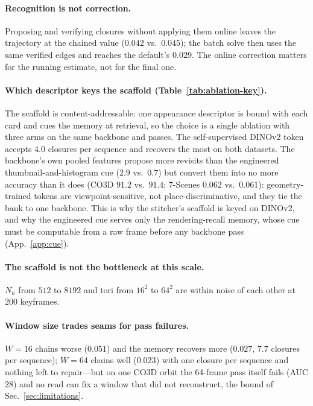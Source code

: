 \paragraph{Recognition is not correction.}
Proposing and verifying closures without applying them online leaves the trajectory at the chained value ($0.042$
vs.\ $0.045$); the batch solve then uses the same verified edges and reaches the default's $0.029$. The online
correction matters for the running estimate, not for the final one.

\paragraph{Which descriptor keys the scaffold (Table~\ref{tab:ablation-key}).}
The scaffold is content-addressable: one appearance descriptor is bound with each card and cues the memory at
retrieval, so the choice is a single ablation with three arms on the same backbone and passes. The self-supervised
DINOv2 token accepts $4.0$ closures per sequence and recovers the most on both datasets. The backbone's own pooled
features propose more revisits than the engineered thumbnail-and-histogram cue ($2.9$ vs.\ $0.7$) but convert them into
no more accuracy than it does (CO3D $91.2$ vs.\ $91.4$; 7-Scenes $0.062$ vs.\ $0.061$): geometry-trained tokens are
viewpoint-sensitive, not place-discriminative, and they tie the bank to one backbone. This is why the stitcher's scaffold
is keyed on DINOv2, and why the engineered cue serves only the rendering-recall memory, whose cue must be computable from a
raw frame before any backbone pass (App.~\ref{app:cue}).

\paragraph{The scaffold is not the bottleneck at this scale.}
$N_h$ from $512$ to $8192$ and tori from $16^2$ to $64^2$ are within noise of each other at 200 keyframes.

\paragraph{Window size trades seams for pass failures.}
$W{=}16$ chains worse ($0.051$) and the memory recovers more ($0.027$, $7.7$ closures per sequence); $W{=}64$ chains well
($0.023$) with one closure per sequence and nothing left to repair---but on one CO3D orbit the 64-frame pass itself fails
(AUC $28$) and no read can fix a window that did not reconstruct, the bound of Sec.~\ref{sec:limitations}.


